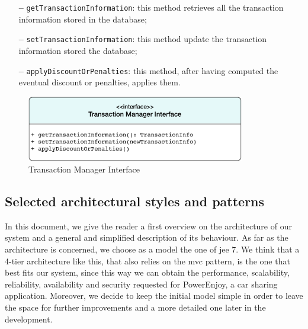 \begin{itemize}
\item[\textbf{--}] \texttt{getTransactionInformation}: this method retrieves all the transaction information stored in the database;
\item[\textbf{--}] \texttt{setTransactionInformation}: this method update the transaction information stored the database;
\item[\textbf{--}] \texttt{applyDiscountOrPenalties}: this method, after having computed the eventual discount or penalties, applies them.
\end{itemize}

\begin{figure}[htbp]
\centering
\vspace{72pt}
\includegraphics[width=0.85\textwidth]{Images/TransactionManager.pdf}
\vspace{10pt}
\caption{Transaction Manager Interface}
\label{fig:transaction}
\end{figure}
\clearpage

\subsection{Selected architectural styles and patterns} \label{arch-styles}

In this document, we give the reader a first overview on the architecture of our system and a general and simplified description of its behaviour.
As far as the architecture is concerned, we choose as a model the one of \acl{jee} 7. We think that a 4-tier architecture like this, that also relies on the \acs{mvc} pattern, is the one that best fits our system, since this way we can obtain the performance, scalability, reliability, availability and security requested for PowerEnjoy, a car sharing application.
Moreover, we decide to keep the initial model simple in order to leave the space for further improvements and a more detailed one later in the development.

